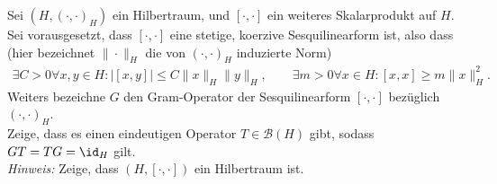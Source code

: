 \begin{exercise}
Sei $(H,(\cdot,\cdot)_H)$ ein Hilbertraum, und $[\cdot,\cdot]$ ein weiteres Skalarprodukt
auf $H$. Sei vorausgesetzt, dass $[\cdot,\cdot]$ eine stetige, koerzive Sesquilinearform
ist, also dass (hier bezeichnet $\|\cdot\|_H$ die von $(\cdot,\cdot)_H$ induzierte Norm)
\begin{align*}
  \exists C > 0 \forall x,y \in H: |[x,y]| \leq C\|x\|_H\|y\|_H, \qquad
  \exists m > 0 \forall x \in H: [x,x] \geq m\|x\|_H^2.
\end{align*}
Weiters bezeichne $G$ den Gram-Operator der Sesquilinearform $[\cdot,\cdot]$
bezüglich $(\cdot,\cdot)_H$. \\
Zeige, dass es einen eindeutigen Operator $T \in \mathcal{B}(H)$ gibt, sodass
$GT = TG = \id_H $ gilt. \\
\textit{Hinweis:} Zeige, dass $(H,[\cdot,\cdot])$ ein Hilbertraum ist.
\end{exercise}
